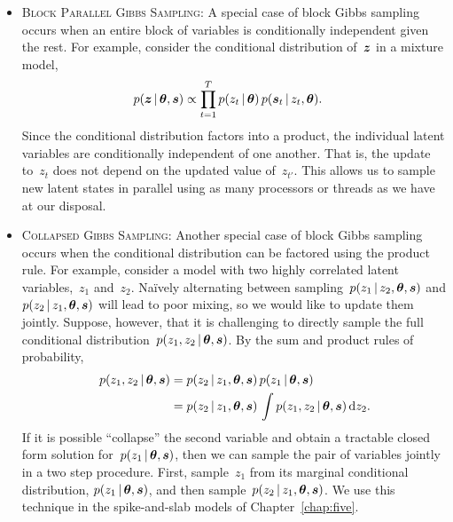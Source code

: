 \begin{itemize}
\item \textsc{Block Parallel Gibbs Sampling}:
  A special case of block Gibbs sampling occurs when an entire block 
  of variables is conditionally independent given the rest. For example,
  consider the conditional distribution of~$\boldsymbol{z}$ in a mixture model,
  \begin{align*}
    p(\boldsymbol{z} \,|\, \boldsymbol{\theta}, \boldsymbol{s}) 
    &\propto \prod_{t=1}^T p(z_t \,|\, \boldsymbol{\theta}) \,
      p(\boldsymbol{s}_t \,|\, z_t, \boldsymbol{\theta}).
  \end{align*}
  Since the conditional distribution factors into a product, the individual
  latent variables are conditionally independent of one another. That is, the 
  update to~$z_t$ does not depend on the updated value of~$z_{t'}$. This 
  allows us to sample new latent states in parallel using as many processors
  or threads as we have at our disposal.

\item \textsc{Collapsed Gibbs Sampling}: Another special case of block
  Gibbs sampling occurs when the conditional distribution can be
  factored using the product rule. For example, consider a model with
  two highly correlated latent variables,~$z_1$ and~$z_2$.  Na\"ively
  alternating between sampling~${p(z_1 \,|\, z_2, \boldsymbol{\theta}, \boldsymbol{s})}$ and
  ${p(z_2 \,|\, z_1, \boldsymbol{\theta}, \boldsymbol{s})}$ will lead to poor mixing, so we
  would like to update them jointly.  Suppose, however, that it is
  challenging to directly sample the full conditional
  distribution~$p(z_1, z_2 \,|\, \boldsymbol{\theta}, \boldsymbol{s})$. By the sum and product rules
  of probability,
  \begin{align*}
    p(z_1, z_2 \,|\, \boldsymbol{\theta}, \boldsymbol{s}) 
    &= p(z_2 \,|\, z_1, \boldsymbol{\theta}, \boldsymbol{s}) \, 
      p(z_1 \,|\, \boldsymbol{\theta}, \boldsymbol{s}) \\
    &= p(z_2 \,|\, z_1, \boldsymbol{\theta}, \boldsymbol{s}) \, 
      \int p(z_1, z_2 \,|\, \boldsymbol{\theta}, \boldsymbol{s}) \, \mathrm{d}z_2.
  \end{align*}
  If it is possible ``collapse'' the second variable and obtain a
  tractable closed form solution for~$p(z_1 \,|\, \boldsymbol{\theta}, \boldsymbol{s})$,
  then we can sample the pair of variables jointly in a two step
  procedure. First, sample~$z_1$ from its marginal conditional
  distribution, $p(z_1 \,|\, \boldsymbol{\theta}, \boldsymbol{s})$, and then
  sample~${p(z_2 \,|\, z_1, \boldsymbol{\theta}, \boldsymbol{s})}$. We use this technique 
  in the spike-and-slab models of Chapter~\ref{chap:five}.
  

\end{itemize}
